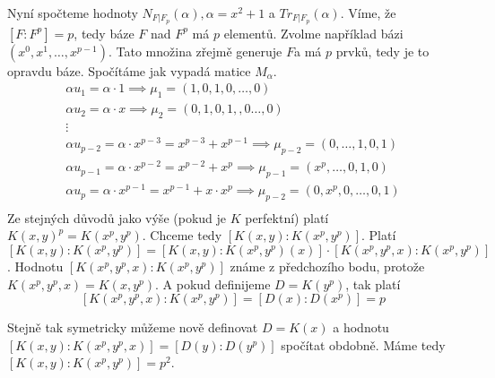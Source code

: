 \documentclass[12pt, a4paper]{article}
\begin{document}
Nyní spočteme hodnoty $N_{F|F_p}(\alpha), \alpha=x^2+1$ a $Tr_{F|F_p}(\alpha)$. Víme, že $[F:F^p]=p$, tedy báze $F$ nad $F^p$ má $p$ elementů. Zvolme například bázi $(x^0,x^1,\dots,x^{p-1})$. Tato množina zřejmě generuje $F$a má $p$ prvků, tedy je to opravdu báze. Spočítáme jak vypadá matice $M_\alpha$.
\begin{gather*}
\alpha u_1 = \alpha \cdot 1 \implies \mu_1 = (1,0,1,0,\dots,0)\\
\alpha u_2 = \alpha \cdot x \implies \mu_2 = (0,1,0,1,,0\dots,0)\\
\vdots\\
\alpha u_{p-2} =  \alpha \cdot x^{p-3} = x^{p-3} + x^{p-1}  \implies \mu_{p-2} = (0,\dots,1,0,1)\\
\alpha u_{p-1} =  \alpha \cdot x^{p-2} = x^{p-2} + x^p  \implies \mu_{p-1} = (x^p,\dots,0,1,0)\\
\alpha u_{p} =  \alpha \cdot x^{p-1} = x^{p-1} + x \cdot x^p  \implies \mu_{p-2} = (0,x^p,0,\dots,0,1)\\
\end{gather*}
Ze stejných důvodů jako výše (pokud je $K$ perfektní) platí $K(x,y)^p = K(x^p,y^p)$. Chceme tedy $[K(x,y):K(x^p,y^p)]$. Platí $[K(x,y):K(x^p,y^p)]= [K(x,y):K(x^p,y^p)(x)] \cdot [K(x^p,y^p,x):K(x^p,y^p)]$. Hodnotu $[K(x^p,y^p,x):K(x^p,y^p)]$ známe z předchozího bodu, protože $K(x^p,y^p,x) = K(x,y^p)$. A pokud definijeme $D = K(y^p)$, tak platí
\[
[K(x^p,y^p,x):K(x^p,y^p)] = [D(x):D(x^p)] = p
\]

Stejně tak symetricky můžeme nově definovat $D=K(x)$ a hodnotu $[K(x,y):K(x^p,y^p,x)]=[D(y):D(y^p)]$ spočítat obdobně. Máme tedy $[K(x,y):K(x^p,y^p)] = p^2$.
\end{document}
